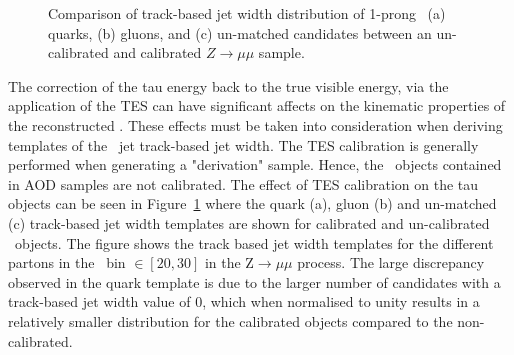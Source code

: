 	 \begin{figure}[!hbt]
		\begin{center}
			\hspace{0.03\textwidth}
			\hspace{0.03\textwidth}
				\hspace{0.03\textwidth}
		\end{center}
		\caption{Comparison of track-based jet width distribution of 1-prong \ftau\ (a) quarks, (b) gluons, and (c) un-matched candidates between an un-calibrated and calibrated $Z\rightarrow \mu\mu$ sample.}
	\label{fig:TES_comp}
	\end{figure}	
	The correction of the tau energy back to the true visible energy, via the application of the \ac{TES} can have significant affects on the kinematic properties of the reconstructed \htau. These effects must be taken into consideration when deriving templates of the \htau\ jet track-based jet width. The \ac{TES} calibration is generally performed when generating a "derivation" sample. Hence, the \htau\ objects contained in \ac{AOD} samples are not calibrated. 
	The effect of \ac{TES} calibration on the tau objects can be seen in Figure~\ref{fig:TES_comp} where the quark (a), gluon (b) and un-matched (c) track-based jet width templates are shown for calibrated and un-calibrated \htau\ objects. The figure shows the track based jet width templates for the different partons in the \pt\ bin $\in[20,30]$ in the Z$\rightarrow\mu\mu$ process. The large discrepancy observed in the quark template is due to the larger number of candidates with a track-based jet width value of 0, which when normalised to unity results in a relatively smaller distribution for the calibrated objects compared to the non-calibrated.
	
	
